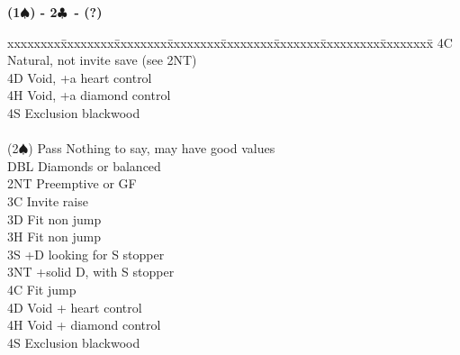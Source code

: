 \documentclass[10pt]{article}
\renewcommand{\c}{$\clubsuit$}
\newcommand{\s}{$\spadesuit$}
\newenvironment{bidtable}[1][]
{\textbf{#1}
  \begin{adjustwidth}{1em}{}
    \addvspace{2pt}
    \begin{tabbing}
      xxxxxxxx\=xxxxxxxx\=xxxxxxxx\=xxxxxxxx\=xxxxxxxx\=xxxxxxx\=xxxxxxxxx\=xxxxxxxx\=\kill}
{\end{tabbing}\end{adjustwidth}\bigskip}%
\begin{document}
\begin{bidtable}[(1\s) - 2\c\ - (?)]
       \> 4C   \> Natural, not invite save (see 2NT)             \\
       \> 4D   \> Void, +a heart control                         \\
       \> 4H   \> Void, +a diamond control                       \\
       \> 4S   \> Exclusion blackwood                            \\
                                                                 \\
(2\s)  \> Pass \> Nothing to say, may have good values           \\
       \> DBL  \> Diamonds or balanced                           \\
       \> 2NT  \> Preemptive or GF                               \\
       \> 3C   \> Invite raise                                   \\
       \> 3D   \> Fit non jump                                   \\
       \> 3H   \> Fit non jump                                   \\
       \> 3S   +D looking for S stopper                      \\
       \> 3NT  +solid D, with S stopper                      \\
       \> 4C   \> Fit jump                                       \\
       \> 4D   \> Void + heart control                           \\
       \> 4H   \> Void + diamond control                         \\
       \> 4S   \> Exclusion blackwood

\end{bidtable}
\end{document}
